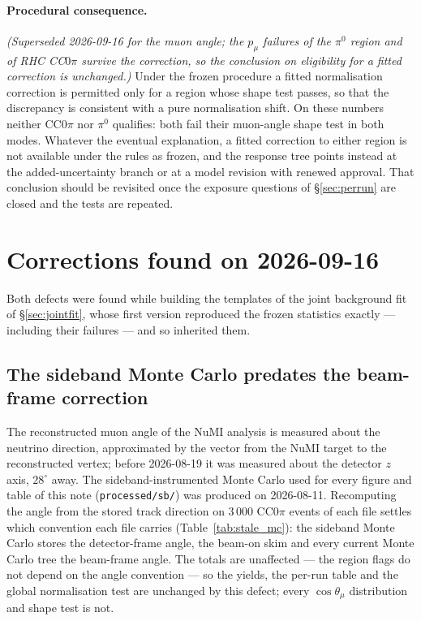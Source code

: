 \documentclass[11pt,a4paper]{article}
\begin{document}
\paragraph{Procedural consequence.} \emph{(Superseded 2026-09-16 for the muon angle; the $p_\mu$ failures of
the $\pi^0$ region and of RHC CC$0\pi$ survive the correction, so the conclusion on eligibility for a fitted
correction is unchanged.)}
Under the frozen procedure a fitted normalisation correction is permitted only for a
region whose shape test passes, so that the discrepancy is consistent with a pure
normalisation shift. On these numbers neither CC$0\pi$ nor $\pi^0$ qualifies: both fail
their muon-angle shape test in both modes. Whatever the eventual explanation, a fitted
correction to either region is not available under the rules as frozen, and the response
tree points instead at the added-uncertainty branch or at a model revision with renewed
approval. That conclusion should be revisited once the exposure questions of
\S\ref{sec:perrun} are closed and the tests are repeated.



\section{Corrections found on 2026-09-16}
\label{sec:corrections}

Both defects were found while building the templates of the joint background fit of \S\ref{sec:jointfit}, whose
first version reproduced the frozen statistics exactly --- including their failures --- and so inherited them.

\subsection{The sideband Monte Carlo predates the beam-frame correction}
\label{sec:stale_mc}

The reconstructed muon angle of the NuMI analysis is measured about the neutrino direction, approximated by the
vector from the NuMI target to the reconstructed vertex; before 2026-08-19 it was measured about the detector $z$
axis, $28^\circ$ away. The sideband-instrumented Monte Carlo used for every figure and table of this note
(\texttt{processed/sb/}) was produced on 2026-08-11. Recomputing the angle from the stored track direction on
3\,000 CC$0\pi$ events of each file settles which convention each file carries (Table~\ref{tab:stale_mc}): the
sideband Monte Carlo stores the detector-frame angle, the beam-on skim and every current Monte Carlo tree the
beam-frame angle. The totals are unaffected --- the region flags do not depend on the angle convention --- so the
yields, the per-run table and the global normalisation test are unchanged by this defect; every $\cos\theta_\mu$
distribution and shape test is not.
\end{document}
